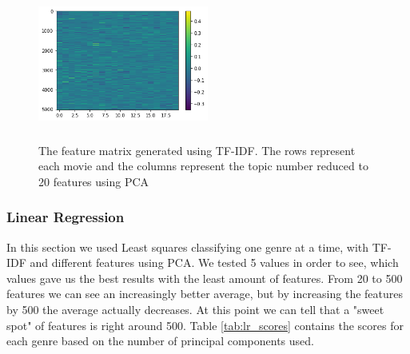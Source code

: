 \documentclass[11pt]{article}
\begin{document}


\begin{figure}[ht]
	\centering
		\includegraphics[width=0.5\textwidth,height=5cm]{TF-IDF.png}
	\caption{The feature matrix generated using TF-IDF. The rows represent each movie and the columns represent the topic number reduced to 20 features using PCA}
	\label{fig:tfidf}
\end{figure}

\label{sec:tfidf}

\subsubsection{Linear Regression}

In this section we used Least squares classifying one genre at a time, with TF-IDF and different features using PCA. We tested 5 values in order to see, which values gave us the best results with the least amount of features. From 20 to 500 features we can see an increasingly better average, but by increasing the features by 500 the average actually decreases. At this point we can tell that a "sweet spot" of features is right around 500. Table \ref{tab:lr_scores} contains the scores for each genre based on the number of principal components used.
\end{document}
